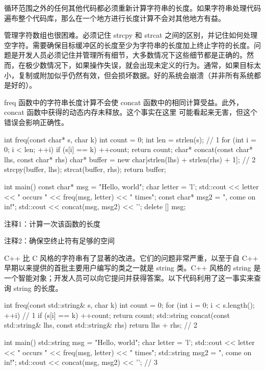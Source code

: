 循环范围之外的任何其他代码都必须重新计算字符串的长度。如果字符串处理代码遍布整个代码库，那么在一个地方进行长度计算不会对其他地方有益。

管理字符数组也很困难。必须记住 strcpy 和 strcat 之间的区别，并记住如何处理空字符。需要确保目标缓冲区的长度至少为字符串的长度加上终止字符的长度。问题是开发人员必须记住并管理所有细节，大多数情况下这些细节都是正确的。然而，在极少数情况下，如果操作失误，就会出现未定义的行为。通常，如果目标太小，复制或附加似乎仍然有效，但会损坏数据。好的系统会崩溃（并非所有系统都是好的）。

freq 函数中的字符串长度计算不会使 concat 函数中的相同计算受益。此外，concat 函数中获得的动态内存未释放。这个事实在这里 可能看起来无害，但这个错误会影响正确性。


\begin{cpp}
int freq(const char* s, char k) {
  int count = 0;
  int len = strlen(s); // 1
  for (int i = 0; i < len; ++i)
    if (s[i] == k)
      ++count;
  return count;
}
char* concat(const char* lhs, const char* rhs) {
  char* buffer = new char[strlen(lhs) + strlen(rhs) + 1]; // 2
  strcpy(buffer, lhs);
  strcat(buffer, rhs);
  return buffer;
}

int main() {
  const char* msg = "Hello, world";
  char letter = 'l';
  std::cout << letter << " occurs " << freq(msg, letter) << " times\n";
  const char* msg2 = ", come on in!";
  std::cout << concat(msg, msg2) << '\n';
  delete [] msg;
}
\end{cpp}

{\footnotesize
注释1：计算一次该函数的长度

注释2：确保空终止符有足够的空间
}


C++ 比 C 风格的字符串有了显著的改进。它们的问题非常严重，以至于自 C++ 早期以来提供的首批主要用户编写的类之一就是 string 类。C++ 风格的 string 是一个智能对象；开发人员可以向它提问并获得答案。以下代码利用了这一事实来查询 string 的长度。


\begin{cpp}
int freq(const std::string& s, char k) {
  int count = 0;
  for (int i = 0; i < s.length(); ++i) // 1
    if (s[i] == k)
      ++count;
  return count;
}
std::string concat(const std::string& lhs, const std::string& rhs) {
  return lhs + rhs; // 2
}

int main() {
  std::string msg = "Hello, world";
  char letter = 'l';
  std::cout << letter << " occurs " << freq(msg, letter) << " times\n";
  std::string msg2 = ", come on in!";
  std::cout << concat(msg, msg2) << '\n'; // 3
}
\end{cpp}

